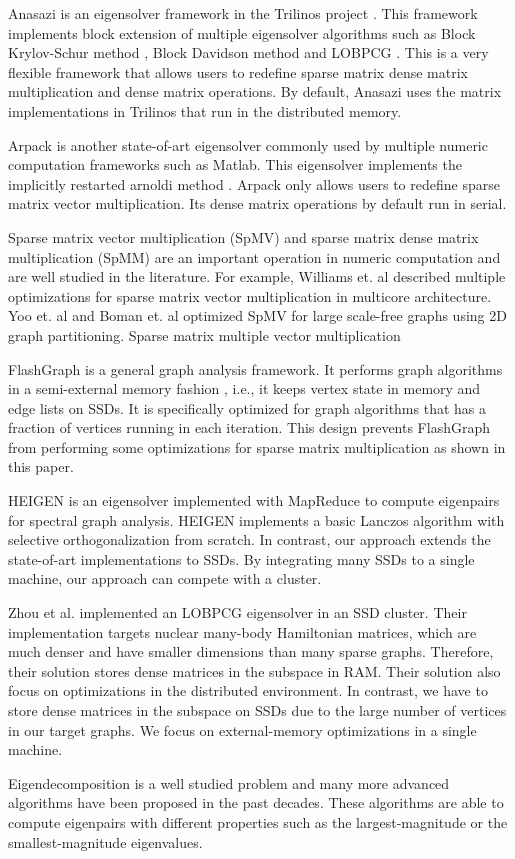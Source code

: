 Anasazi \cite{anasazi} is an eigensolver framework in the Trilinos project
\cite{trilinos}. This framework implements block extension of multiple
eigensolver algorithms
such as Block Krylov-Schur method \cite{krylovschur}, Block Davidson method
\cite{Arbenz05} and LOBPCG \cite{Arbenz05}. This is a very flexible framework
that allows users to redefine sparse matrix dense matrix multiplication and
dense matrix operations. By default, Anasazi uses the matrix implementations
in Trilinos that run in the distributed memory.

Arpack \cite{arpack} is another state-of-art eigensolver commonly used by
multiple numeric computation frameworks such as Matlab. This eigensolver
implements the implicitly restarted arnoldi method \cite{IRAM}. Arpack
only allows users to redefine sparse matrix vector multiplication.
Its dense matrix operations by default run in serial.

Sparse matrix vector multiplication (SpMV) and sparse matrix dense matrix
multiplication (SpMM) are an important operation in numeric computation and
are well studied in the literature. For example, Williams et. al
\cite{Williams07} described multiple optimizations for sparse matrix
vector multiplication in multicore architecture. Yoo et. al \cite{Yoo11}
and Boman et. al \cite{Boman2013} optimized SpMV for large scale-free graphs
using 2D graph partitioning. Sparse matrix multiple vector multiplication
\cite{Aktulga14}

FlashGraph \cite{flashgraph} is a general graph analysis framework. It performs
graph algorithms in a semi-external memory fashion \cite{sem}, i.e., it keeps
vertex state in memory and edge lists on SSDs. It is specifically optimized for
graph algorithms that has a fraction of vertices running in each iteration.
This design prevents FlashGraph from performing some optimizations for sparse
matrix multiplication as shown in this paper.

HEIGEN \cite{Kang11} is an eigensolver implemented with MapReduce \cite{mapreduce}
to compute eigenpairs for spectral graph analysis. HEIGEN implements a basic
Lanczos algorithm
\cite{Lanczos} with selective orthogonalization from scratch. In contrast, our
approach extends the state-of-art implementations to SSDs. By integrating many
SSDs to a single machine, our approach can compete with a cluster.

Zhou et al. \cite{Zhou12} implemented an LOBPCG \cite{Arbenz05} eigensolver in
an SSD cluster. Their implementation targets nuclear many-body Hamiltonian
matrices, which are much denser and have smaller dimensions than many sparse
graphs. Therefore, their solution stores dense matrices in the subspace in RAM.
Their solution also focus on optimizations in the distributed
environment. In contrast, we have to store dense matrices in the subspace
on SSDs due to the large number of vertices in our target graphs. We focus
on external-memory optimizations in a single machine.

Eigendecomposition
is a well studied problem and many more advanced algorithms have been proposed
in the past decades. These algorithms are able to compute eigenpairs with
different properties such as the largest-magnitude or the smallest-magnitude
eigenvalues.
